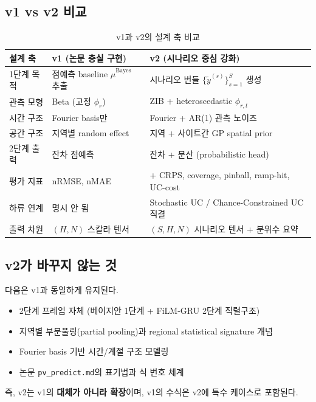 \documentclass[11pt,a4paper]{article}
\begin{document}
\subsection{v1 vs v2 비교}

\begin{table}[H]
\centering
\small
\caption{v1과 v2의 설계 축 비교}
\begin{tabular}{lll}
\toprule
설계 축 & v1 (논문 충실 구현) & v2 (시나리오 중심 강화) \\
\midrule
1단계 목적 & 점예측 baseline $\hat\mu^{\mathrm{Bayes}}$ 추출 & 시나리오 번들 $\{\tilde y^{(s)}\}_{s=1}^{S}$ 생성 \\
관측 모형 & Beta (고정 $\phi_r$) & ZIB + heteroscedastic $\phi_{r,t}$ \\
시간 구조 & Fourier basis만 & Fourier + AR(1) 관측 노이즈 \\
공간 구조 & 지역별 random effect & 지역 + 사이트간 GP spatial prior \\
2단계 출력 & 잔차 점예측 & 잔차 + 분산 (probabilistic head) \\
평가 지표 & nRMSE, nMAE & + CRPS, coverage, pinball, ramp-hit, UC-cost \\
하류 연계 & 명시 안 됨 & Stochastic UC / Chance-Constrained UC 직결 \\
출력 차원 & $(H, N)$ 스칼라 텐서 & $(S, H, N)$ 시나리오 텐서 + 분위수 요약 \\
\bottomrule
\end{tabular}
\end{table}

\subsection{v2가 바꾸지 않는 것}

다음은 v1과 동일하게 유지된다.
\begin{itemize}[leftmargin=2em]
    \item 2단계 프레임 자체 (베이지안 1단계 + FiLM-GRU 2단계 직렬구조)
    \item 지역별 부분풀링(partial pooling)과 regional statistical signature 개념
    \item Fourier basis 기반 시간/계절 구조 모델링
    \item 논문 \texttt{pv\_predict.md}의 표기법과 식 번호 체계
\end{itemize}

즉, v2는 v1의 \textbf{대체가 아니라 확장}이며, v1의 수식은 v2에 특수 케이스로 포함된다.

\end{document}
